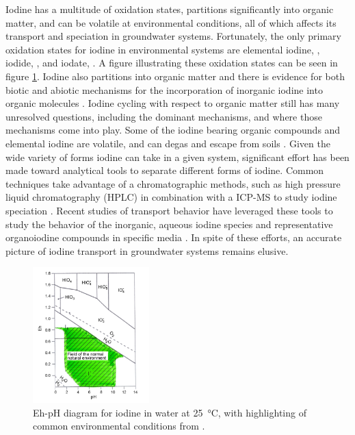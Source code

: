 \documentclass[twoside,12pt,titlepage]{article}
\begin{document}
\par Iodine has a multitude of oxidation states, partitions significantly into organic matter, and can be volatile at environmental conditions, all of which affects its transport and speciation in groundwater systems. Fortunately, the only primary oxidation states for iodine in environmental systems are elemental iodine, , iodide, , and iodate,  \cite{Hou2009}. A figure illustrating these oxidation states can be seen in figure \ref{fig:IodineSpeciation}. Iodine also partitions into organic matter and there is evidence for both biotic and abiotic mechanisms for the incorporation of inorganic iodine into organic molecules \cite{Gilfedder2010}. Iodine cycling with respect to organic matter still has many unresolved questions, including the dominant mechanisms, and where those mechanisms come into play. Some of the iodine bearing organic compounds and elemental iodine are volatile, and can degas and escape from soils \cite{Hu2009}. Given the wide variety of forms iodine can take in a given system, significant effort has been made toward analytical tools to separate different forms of iodine. Common techniques take advantage of a chromatographic methods, such as high pressure liquid chromatography (HPLC) in combination with a ICP-MS to study iodine speciation \cite{Wuilloud2005}. Recent studies of transport behavior have leveraged these tools to study the behavior of the inorganic, aqueous iodine species and representative organoiodine compounds in specific media \cite{Hu2005}. In spite of these efforts, an accurate picture of iodine transport in groundwater systems remains elusive.

\begin{figure}
\centering
\includegraphics[width = 0.4\textwidth]{IodineSpeciation.png}
\caption{Eh-pH diagram for iodine in water at \SI{25}{\degreeCelsius}, with highlighting of common environmental conditions from \cite{Hou2009}.}
\label{fig:IodineSpeciation}
\end{figure}
\end{document}
